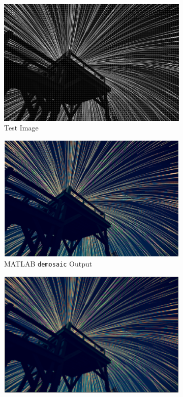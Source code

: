 \documentclass[12pt]{article}
\begin{document}
\begin{figure}[htp]
    \centering
    \begin{subfigure}[b]{0.6\textwidth}
        \centering
        \includegraphics[width=\textwidth]{test2}
        \caption{Test Image}
        \label{fig:test2_mosaic}
    \end{subfigure}
    \hfill
    \begin{subfigure}[b]{0.6\textwidth}
        \centering
        \includegraphics[width=\textwidth]{test2_matlab}
        \caption{MATLAB \texttt{demosaic} Output}
        \label{fig:test2_matlab}
    \end{subfigure}
    \hfill
    \begin{subfigure}[b]{0.6\textwidth}
        \centering
        \includegraphics[width=\textwidth]{test2_interp}

\end{subfigure}
\end{figure}
\end{document}
